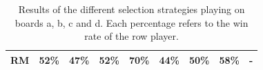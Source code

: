 \documentclass{article}
\begin{document}
\begin{table}[t]
\begin{tabular}{|c||c|c|c|c|c|c|c|c|}
        RM & 52\% & 47\% & 52\% & 70\% & 44\% & 50\% & 58\% &    - \\ \hline 
\end{tabular}
\caption{Results of the different selection strategies playing on boards a, b, c and d. 
Each percentage refers to the win rate of the row player. \label{table:round_robin}}
\end{table}
\end{document}
